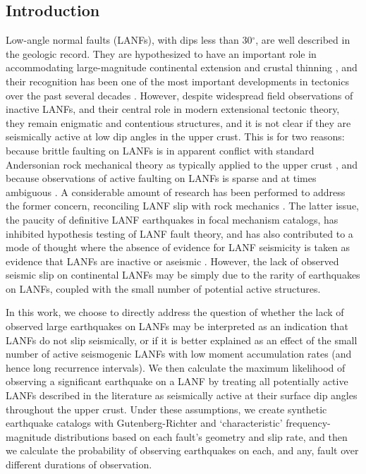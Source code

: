 \documentclass[draft,grl]{AGUTeX}
\begin{document}
\begin{article}

\section{Introduction}
Low-angle normal faults (LANFs), with dips less than 30$^\circ$, are
well described in the geologic record. They are hypothesized to have
an important role in accommodating large-magnitude continental
extension \citep{howard1987crustal} and crustal thinning
\citep{lister1986detachment}, and their recognition has been one of
the most important developments in tectonics over the past several
decades \citep{wernicke2009detachment}. However, despite widespread
field observations of inactive LANFs, and their central role in modern
extensional tectonic theory, they remain enigmatic and contentious
structures, and it is not clear if they are seismically active at low dip 
angles in the upper crust. This is for two reasons: because brittle faulting
on LANFs is in apparent conflict with standard Andersonian rock mechanical
theory as typically applied to the upper crust
\citep{axen2004lanfmech}, and because observations of active faulting
on LANFs is sparse and at times ambiguous \citep{wernicke1995seis}. A
considerable amount of research has been performed to address the
former concern, reconciling LANF slip with rock mechanics \citep [e.g.,]
[]{axenbartley1997, collettini2011lanfmech}. The latter issue, the paucity of 
definitive LANF earthquakes in focal mechanism catalogs, has inhibited
hypothesis testing of LANF fault theory, and has also contributed to a mode
of thought where the  absence of evidence for LANF seismicity is taken
as evidence that LANFs are inactive or aseismic \citep{jackson1987,
collettinisibson2001}. However, the lack of observed seismic slip on
continental LANFs may be simply due to the rarity of earthquakes on
LANFs, coupled with the small number of potential active structures.

In this work, we choose to directly address the question of whether
the lack of observed large earthquakes on LANFs may be 
interpreted as an indication that
LANFs do not slip seismically, or if it is better explained as an
effect of the small number of active seismogenic LANFs with low moment
accumulation rates (and hence long recurrence intervals). 
We then calculate the maximum likelihood of observing a significant
earthquake on a LANF by treating all potentially active LANFs described in the 
literature as seismically active at their surface dip angles 
throughout the upper crust. %
Under these assumptions, we create synthetic earthquake catalogs with
Gutenberg-Richter and `characteristic' frequency-magnitude distributions
based on each fault's geometry and slip rate, and then we calculate the
probability of observing earthquakes on each, and any, fault over different
durations of observation.


\end{article}
\end{document}
